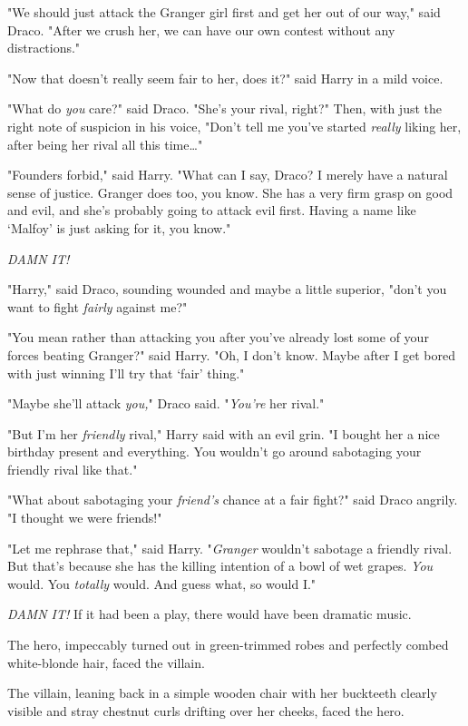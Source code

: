 "We should just attack the Granger girl first and get her out of our way," said 
Draco. "After we crush her, we can have our own contest without any 
distractions."

"Now that doesn't really seem fair to her, does it?" said Harry in a mild voice.

"What do \emph{you} care?" said Draco. "She's your rival, right?" Then, with 
just the right note of suspicion in his voice, "Don't tell me you've started 
\emph{really} liking her, after being her rival all this time{\ldots}"

"Founders forbid," said Harry. "What can I say, Draco? I merely have a natural 
sense of justice. Granger does too, you know. She has a very firm grasp on good 
and evil, and she's probably going to attack evil first. Having a name like 
`Malfoy' is just asking for it, you know."

\emph{DAMN IT!}

"Harry," said Draco, sounding wounded and maybe a little superior, "don't you 
want to fight \emph{fairly} against me?"

"You mean rather than attacking you after you've already lost some of your 
forces beating Granger?" said Harry. "Oh, I don't know. Maybe after I get bored 
with just winning I'll try that `fair' thing."

"Maybe she'll attack \emph{you,}" Draco said. "\emph{You're} her rival."

"But I'm her \emph{friendly} rival," Harry said with an evil grin. "I bought 
her a nice birthday present and everything. You wouldn't go around sabotaging 
your friendly rival like that."

"What about sabotaging your \emph{friend's} chance at a fair fight?" said Draco 
angrily. "I thought we were friends!"

"Let me rephrase that," said Harry. "\emph{Granger} wouldn't sabotage a 
friendly rival. But that's because she has the killing intention of a bowl of 
wet grapes. \emph{You} would. You \emph{totally} would. And guess what, so 
would I."

\emph{DAMN IT!}
\sbreak
If it had been a play, there would have been dramatic music.

The hero, impeccably turned out in green-trimmed robes and perfectly combed 
white-blonde hair, faced the villain.

The villain, leaning back in a simple wooden chair with her buckteeth clearly 
visible and stray chestnut curls drifting over her cheeks, faced the hero.

